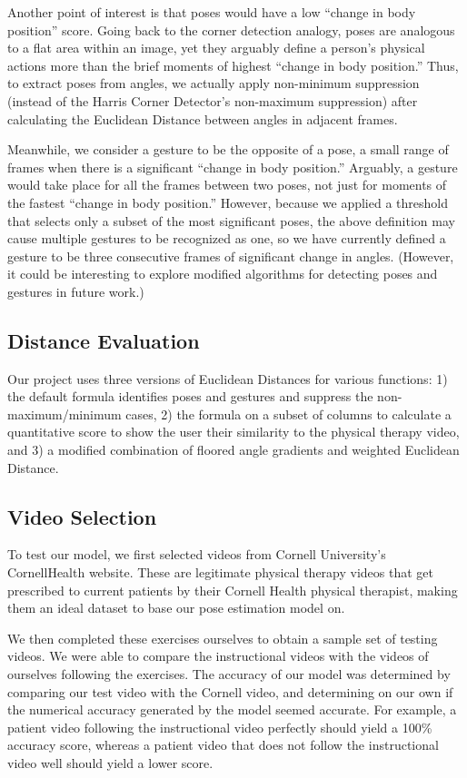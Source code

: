 \indent Another point of interest is that poses would have a low “change in body position” score. Going back to the 
corner detection analogy, poses are analogous to a flat area within an  image, yet they arguably define a 
person’s physical actions more than the brief moments of highest “change in body position.” Thus, to extract 
poses from angles, we actually apply non-minimum suppression (instead of the Harris Corner Detector’s 
non-maximum suppression) after calculating the Euclidean Distance between angles in adjacent frames.

\indent Meanwhile, we consider a gesture to be the opposite of a pose, a small range of frames when there is a 
significant “change in body position.” Arguably, a gesture would take place for all the frames between 
two poses, not just for moments of the fastest “change in body position.” However, because we applied a 
threshold that selects only a subset of the most significant poses, the above definition may cause multiple 
gestures to be recognized as one, so we have currently defined a gesture to be three consecutive frames of 
significant change in angles. (However, it could be interesting to explore modified algorithms for detecting 
poses and gestures in future work.)

\subsection{Distance Evaluation}
\indent Our project uses three versions of Euclidean Distances for 
various functions: 1) the default formula identifies poses and gestures 
and suppress the non-maximum/minimum cases, 2) the formula on a subset 
of columns to calculate a quantitative score to show the user their 
similarity to the physical therapy video, and 3) a modified combination 
of floored angle gradients and weighted Euclidean Distance. 

\subsection{Video Selection}
\indent To test our model, we first selected videos from Cornell 
University’s CornellHealth website\cite{Alpher11}. These are legitimate 
physical therapy videos that get prescribed to current patients by their 
Cornell Health physical therapist, making them an ideal dataset to base 
our pose estimation model on.

\indent We then completed these exercises ourselves to obtain a sample 
set of testing videos. We were able to compare the instructional videos 
with the videos of ourselves following the exercises. The accuracy of 
our model was determined by comparing our test video with the Cornell 
video, and determining on our own if the numerical accuracy generated 
by the model seemed accurate. For example, a patient video following 
the instructional video perfectly should yield a 100\% accuracy score, 
whereas a patient video that does not follow the instructional video 
well should yield a lower score.
